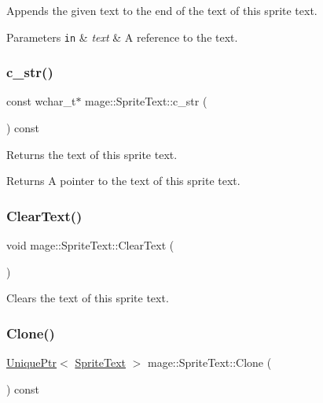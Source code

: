 Appends the given text to the end of the text of this sprite text.


\begin{DoxyParams}[1]{Parameters}
\mbox{\tt in}  & {\em text} & A reference to the text. \\
\hline
\end{DoxyParams}
\hypertarget{classmage_1_1_sprite_text_a236e243b8832cb6e32b1341e798d25bb}{}\label{classmage_1_1_sprite_text_a236e243b8832cb6e32b1341e798d25bb} 
\subsubsection{\texorpdfstring{c\+\_\+str()}{c\_str()}}
{\footnotesize\ttfamily const wchar\+\_\+t$\ast$ mage\+::\+Sprite\+Text\+::c\+\_\+str (\begin{DoxyParamCaption}{ }\end{DoxyParamCaption}) const\hspace{0.3cm}{\ttfamily [noexcept]}}

Returns the text of this sprite text.

\begin{DoxyReturn}{Returns}
A pointer to the text of this sprite text. 
\end{DoxyReturn}
\hypertarget{classmage_1_1_sprite_text_a73c5a10e846e94f2f79a25a78bf2e6d0}{}\label{classmage_1_1_sprite_text_a73c5a10e846e94f2f79a25a78bf2e6d0} 
\subsubsection{\texorpdfstring{Clear\+Text()}{ClearText()}}
{\footnotesize\ttfamily void mage\+::\+Sprite\+Text\+::\+Clear\+Text (\begin{DoxyParamCaption}{ }\end{DoxyParamCaption})}

Clears the text of this sprite text. \hypertarget{classmage_1_1_sprite_text_ad76e6d91e59f5070152104da8af1aa4e}{}\label{classmage_1_1_sprite_text_ad76e6d91e59f5070152104da8af1aa4e} 
\subsubsection{\texorpdfstring{Clone()}{Clone()}}
{\footnotesize\ttfamily \hyperlink{namespacemage_a3316d7143a973e37adf1110f2e80ca31}{Unique\+Ptr}$<$ \hyperlink{classmage_1_1_sprite_text}{Sprite\+Text} $>$ mage\+::\+Sprite\+Text\+::\+Clone (\begin{DoxyParamCaption}{ }\end{DoxyParamCaption}) const}

